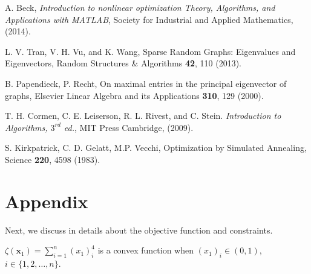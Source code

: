 \documentclass[envcountreset,oribibl]{llncs}
\begin{document}
\begin{thebibliography}{0}
A. Beck, \emph{Introduction to nonlinear optimization Theory, Algorithms, and Applications with MATLAB}, Society for Industrial and Applied Mathematics, (2014). 


 L. V. Tran, V. H. Vu, and K. Wang, Sparse Random Graphs: Eigenvalues and Eigenvectors, Random Structures \& Algorithms {\bf 42}, 110 (2013). 

 B. Papendieck, P. Recht, On maximal entries in the principal eigenvector of graphs, Elsevier Linear Algebra and its Applications {\bf 310}, 129 (2000). 

 T. H. Cormen, C. E. Leiserson, R. L. Rivest, and C. Stein. \emph {Introduction to Algorithms, $3^{rd}$ ed.}, MIT Press Cambridge, (2009).

 S. Kirkpatrick, C. D. Gelatt, M.P. Vecchi, Optimization by Simulated Annealing, Science \textbf{220}, 4598 (1983).


\end{thebibliography}

\section*{Appendix}

Next, we discuss in details about the objective function and constraints. 
% 
\begin{lemma}
$\zeta({\bm{x}_1})=\sum_{i=1}^n (x_{1})_{i}^4$ is a convex function when $(x_1)_i \in (0,1)$, $i \in \{1, 2, \ldots, n\}$. 
\end{lemma}
\end{document}
